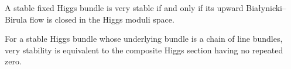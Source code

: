 \begin{theorem}
\label{very-stable-higgs-bundles-equivariant-multiplicity-mirror-symmetry-main}
A stable fixed Higgs bundle is very stable if and only if its upward Białynicki--Birula flow is closed in the Higgs moduli space.
\notready
\end{theorem}

\begin{theorem}
\label{very-stable-higgs-bundles-equivariant-multiplicity-mirror-symmetry-secondary}
For a stable Higgs bundle whose underlying bundle is a chain of line bundles, very stability is equivalent to the composite Higgs section having no repeated zero.
\notready
\end{theorem}
